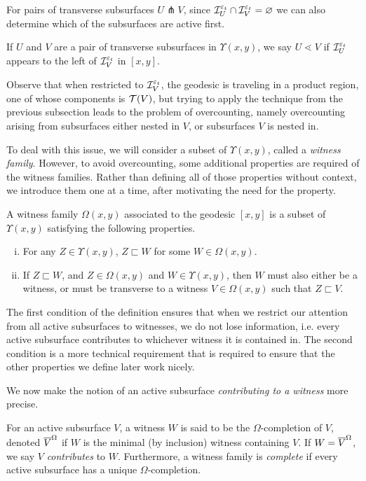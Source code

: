 For pairs of transverse subsurfaces $U \pitchfork V$, since $\mathcal{I}_U^{\varepsilon_t} \cap \mathcal{I}_V^{\varepsilon_t} = \varnothing$ we can also determine which of the subsurfaces are active first.
\begin{definition}
  If $U$ and $V$ are a pair of transverse subsurfaces in $\Upsilon(x,y)$, we say $U \lessdot V$ if $\mathcal{I}_U^{\varepsilon_t}$ appears to the left of $\mathcal{I}_V^{\varepsilon_t}$ in $[x,y]$.
\end{definition}

Observe that when restricted to $\mathcal{I}_V^{\varepsilon_t}$, the geodesic is traveling in a product region, one of whose components is $\mathcal{T}(V)$, but trying to apply the technique from the previous subsection leads to the problem of overcounting, namely overcounting arising from subsurfaces either nested in $V$, or subsurfaces $V$ is nested in.

To deal with this issue, we will consider a subset of $\Upsilon(x,y)$, called a \emph{witness family}.
However, to avoid overcounting, some additional properties are required of the witness families.
Rather than defining all of those properties without context, we introduce them one at a time, after motivating the need for the property.

\begin{definition}
  A witness family $\Omega(x,y)$ associated to the geodesic $[x,y]$ is a subset of $\Upsilon(x, y)$ satisfying the following properties.
  \begin{enumerate}[(i)]
  \item For any $Z \in \Upsilon(x,y)$, $Z \sqsubset W$ for some $W \in \Omega(x,y)$.
  \item If $Z \sqsubset W$, and $Z \in \Omega(x,y)$ and $W \in \Upsilon(x,y)$, then $W$ must also either be a witness, or must be transverse to a witness $V \in \Omega(x,y)$ such that $Z \sqsubset V$.
  \end{enumerate}
\end{definition}
The first condition of the definition ensures that when we restrict our attention from all active subsurfaces to witnesses, we do not lose information, i.e. every active subsurface contributes to whichever witness it is contained in.
The second condition is a more technical requirement that is required to ensure that the other properties we define later work nicely.

We now make the notion of an active subsurface \emph{contributing to a witness} more precise.
\begin{definition}
  For an active subsurface $V$, a witness $W$ is said to be the $\Omega$-completion of $V$, denoted $\overline{V}^{\Omega}$ if $W$ is the minimal (by inclusion) witness containing $V$.
  If $W = \overline{V}^{\Omega}$, we say $V$ \emph{contributes} to $W$.
  Furthermore, a witness family is \emph{complete} if every active subsurface has a unique $\Omega$-completion.
\end{definition}

